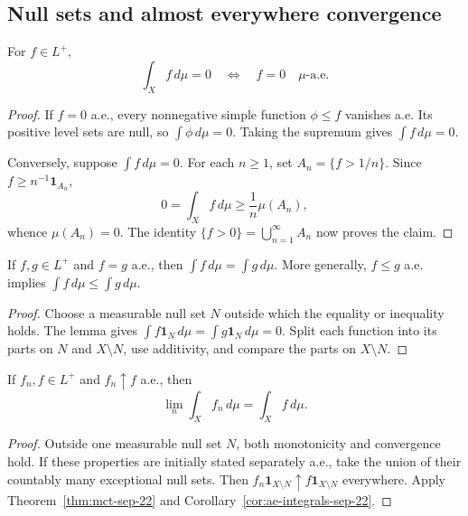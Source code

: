 \subsection{Null sets and almost everywhere convergence}

\begin{lemma}
  \label{lem:zero-integral-sep-22}
  For $f\in L^+$,
  \[
    \int_X f\,d\mu=0
    \quad\Longleftrightarrow\quad f=0\quad\mu\text{-a.e.}
  \]
\end{lemma}

\begin{proof}
  If $f=0$ a.e., every nonnegative simple function $\phi\leq f$
  vanishes a.e. Its positive level sets are null, so
  $\int\phi\,d\mu=0$. Taking the supremum gives $\int f\,d\mu=0$.

  Conversely, suppose $\int f\,d\mu=0$. For each $n\geq1$, set
  $A_n=\{f>1/n\}$. Since $f\geq n^{-1}\mathbf 1_{A_n}$,
  \[
    0=\int_X f\,d\mu\geq\frac1n\mu(A_n),
  \]
  whence $\mu(A_n)=0$. The identity
  $\{f>0\}=\bigcup_{n=1}^{\infty}A_n$ now proves the claim.
\end{proof}

\begin{corollary}
  \label{cor:ae-integrals-sep-22}
  If $f,g\in L^+$ and $f=g$ a.e., then $\int f\,d\mu=\int g\,d\mu$.
  More generally, $f\leq g$ a.e. implies
  $\int f\,d\mu\leq\int g\,d\mu$.
\end{corollary}

\begin{proof}
  Choose a measurable null set $N$ outside which the equality or
  inequality holds. The lemma gives
  $\int f\mathbf 1_N\,d\mu=\int g\mathbf 1_N\,d\mu=0$.
  Split each function into its parts on $N$ and $X\setminus N$, use
  additivity, and compare the parts on $X\setminus N$.
\end{proof}

\begin{corollary}
  If $f_n,f\in L^+$ and $f_n\uparrow f$ a.e., then
  \[
    \lim_n\int_X f_n\,d\mu=\int_X f\,d\mu.
  \]
\end{corollary}

\begin{proof}
  Outside one measurable null set $N$, both monotonicity and convergence
  hold. If these properties are initially stated separately a.e., take
  the union of their countably many exceptional null sets. Then
  $f_n\mathbf 1_{X\setminus N}\uparrow f\mathbf 1_{X\setminus N}$
  everywhere. Apply Theorem~\ref{thm:mct-sep-22} and
  Corollary~\ref{cor:ae-integrals-sep-22}.
\end{proof}

